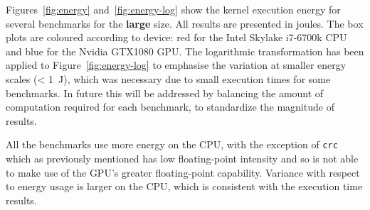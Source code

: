 \documentclass[../document.tex]{subfiles}
\begin{document}

Figures~\ref{fig:energy} and~\ref{fig:energy-log} show the kernel execution energy for several benchmarks for the {\bf large} size.
All results are presented in joules.
The box plots are coloured according to device: red for the Intel Skylake i7-6700k CPU and blue for the Nvidia GTX1080 GPU.
The logarithmic transformation has been applied to Figure~\ref{fig:energy-log} to emphasise the variation at smaller energy scales (< \SI{1}{\joule}), which was necessary due to small execution times for some benchmarks.
In future this will be addressed by balancing the amount of computation required for each benchmark, to standardize the magnitude of results.

All the benchmarks use more energy on the CPU, with the exception of {\tt crc} which as previously mentioned has low floating-point intensity and so is not able to make use of the GPU's greater floating-point capability. 
Variance with respect to energy usage is larger on the CPU, which is consistent with the execution time results.
\end{document}

